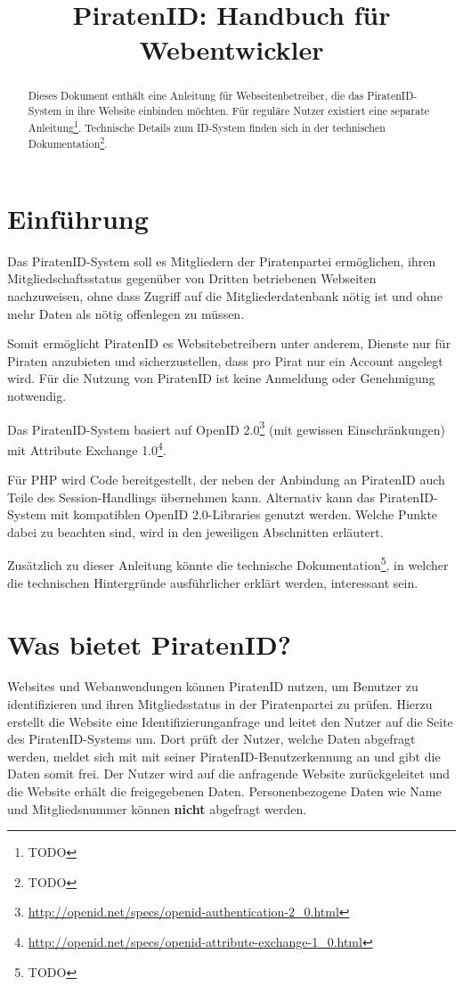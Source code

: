

\title{PiratenID: Handbuch für Webentwickler}


\maketitle

\begin{abstract}\noindent
Dieses Dokument enthält eine Anleitung für Webseitenbetreiber, die das PiratenID-System in ihre Website einbinden möchten.
Für reguläre Nutzer existiert eine separate Anleitung\footnote{TODO}.
Technische Details zum ID-System finden sich in der technischen Dokumentation\footnote{TODO}.
\end{abstract}


\section{Einführung}
Das PiratenID-System soll es Mitgliedern der Piratenpartei ermöglichen, ihren Mitgliedschaftsstatus gegenüber von Dritten betriebenen Webseiten nachzuweisen,
ohne dass Zugriff auf die Mitgliederdatenbank nötig ist und ohne mehr Daten als nötig offenlegen zu müssen.

Somit ermöglicht PiratenID es Websitebetreibern unter anderem, Dienste nur für Piraten anzubieten und sicherzustellen, dass pro Pirat nur ein Account angelegt wird.
Für die Nutzung von PiratenID ist keine Anmeldung oder Genehmigung notwendig.

Das PiratenID-System basiert auf OpenID 2.0\footnote{\url{http://openid.net/specs/openid-authentication-2_0.html}} (mit gewissen Einschränkungen)
mit Attribute Exchange 1.0\footnote{\url{http://openid.net/specs/openid-attribute-exchange-1_0.html}}.

Für PHP wird Code bereitgestellt, der neben der Anbindung an PiratenID auch Teile des Session-Handlings übernehmen kann.
Alternativ kann das PiratenID-System mit kompatiblen OpenID 2.0-Libraries genutzt werden.
Welche Punkte dabei zu beachten sind, wird in den jeweiligen Abschnitten erläutert.

Zusätzlich zu dieser Anleitung könnte die technische Dokumentation\footnote{TODO},
in welcher die technischen Hintergründe ausführlicher erklärt werden, interessant sein.

\newpage
\section{Was bietet PiratenID?}
Websites und Webanwendungen können PiratenID nutzen, um Benutzer zu identifizieren und ihren Mitgliedsstatus in der Piratenpartei zu prüfen.
Hierzu erstellt die Website eine Identifizierunganfrage und leitet den Nutzer auf die Seite des PiratenID-Systems um.
Dort prüft der Nutzer, welche Daten abgefragt werden, meldet sich mit mit seiner PiratenID-Benutzerkennung an und gibt die Daten somit frei.
Der Nutzer wird auf die anfragende Website zurückgeleitet und die Website erhält die freigegebenen Daten.
Personenbezogene Daten wie Name und Mitgliedsnummer können \textbf{nicht} abgefragt werden.

